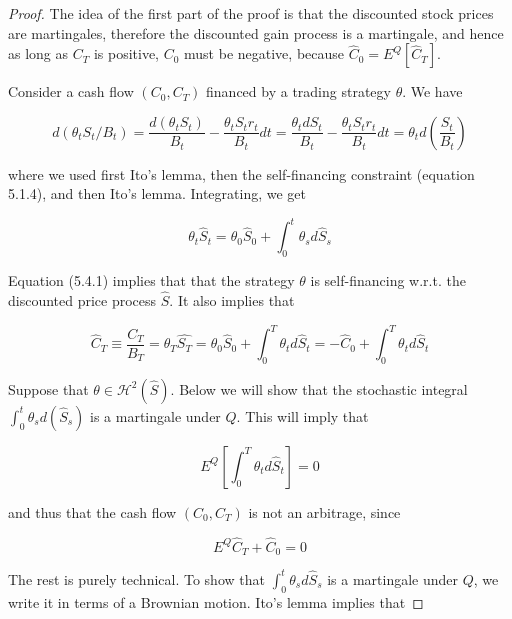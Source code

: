 \documentclass[\topdir/lecture\_notes.tex]{subfiles}
\begin{document}
\begin{proof}
The idea of the first part of the proof is that the discounted stock prices are martingales, therefore the discounted gain process is a martingale, and hence as long as $C_{T}$ is positive, $C_{0}$ must be negative, because $\hat{C}_{0}=E^{Q}\left[\hat{C}_{T}\right]$.

Consider a cash flow $\left(C_{0}, C_{T}\right)$ financed by a trading strategy $\theta$. We have

\begin{equation*}
d\left(\theta_{t} S_{t}/B_{t}\right)=\frac{d\left(\theta_{t} S_{t}\right)}{B_{t}}-\frac{\theta_{t} S_{t} r_{t}}{B_{t}} d t=\frac{\theta_{t} d S_{t}}{B_{t}}-\frac{\theta_{t} S_{t} r_{t}}{B_{t}} d t=\theta_{t} d\left(\frac{S_{t}}{B_{t}}\right)
\end{equation*}

where we used first Ito's lemma, then the self-financing constraint (equation 5.1.4), and then Ito's lemma. Integrating, we get

\begin{equation*}
\theta_{t} \hat{S}_{t}=\theta_{0} \hat{S}_{0}+\int_{0}^{t} \theta_{s} d \hat{S}_{s}
\end{equation*}

Equation (5.4.1) implies that that the strategy $\theta$ is self-financing w.r.t. the discounted price process $\hat{S}$. It also implies that

\begin{equation*}
\hat{C}_{T} \equiv \frac{C_{T}}{B_{T}}=\theta_{T} \hat{S_{T}}=\theta_{0} \hat{S}_{0}+\int_{0}^{T} \theta_{t} d \hat{S}_{t}=-\hat{C}_{0}+\int_{0}^{T} \theta_{t} d \hat{S}_{t}
\end{equation*}

Suppose that $\theta \in \mathcal{H}^{2}(\hat{S})$. Below we will show that the stochastic integral $\int_{0}^{t} \theta_{s} d\left(\hat{S}_{s}\right)$ is a martingale under $Q$. This will imply that

\begin{equation*}
E^{Q}\left[\int_{0}^{T} \theta_{t} d \hat{S}_{t}\right]=0
\end{equation*}

and thus that the cash flow $\left(C_{0}, C_{T}\right)$ is not an arbitrage, since

\begin{equation*}
E^{Q} \hat{C}_{T}+\hat{C}_{0}=0
\end{equation*}

The rest is purely technical. To show that $\int_{0}^{t} \theta_{s} d \hat{S}_{s}$ is a martingale under $Q$, we write it in terms of a Brownian motion. Ito's lemma implies that


\end{proof}
\end{document}
